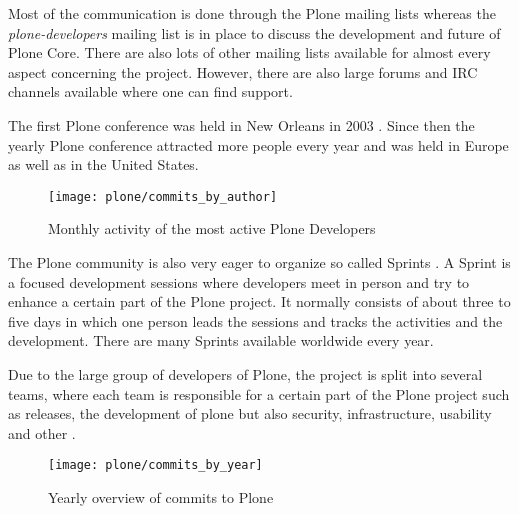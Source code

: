 Most of the communication is done through the Plone mailing lists whereas the
\emph{plone-developers} mailing list is in place to discuss the development and
future of Plone Core. There are also lots of other mailing lists available for
almost every aspect concerning the project. However, there are also large
forums and \ac{IRC} channels available where one can find support.

The first Plone conference was held in New Orleans in 2003
\cite{PloneConferences}. Since then the yearly Plone conference attracted more
people every year and was held in Europe as well as in the United States.

\begin{figure}[htbp]
  \centering
  \texttt{[image: plone/commits\_by\_author]}
  \caption{Monthly activity of the most active Plone Developers}
\end{figure}

The Plone community is also very eager to organize so called Sprints
\cite{PloneSprints}. A Sprint is a focused development sessions where
developers meet in person and try to enhance a certain part of the Plone
project. It normally consists of about three to five days in which one person
leads the sessions and tracks the activities and the development. There are
many Sprints available worldwide every year.

Due to the large group of developers of Plone, the project is split into
several teams, where each team is responsible for a certain part of the Plone
project such as releases, the development of plone but also security,
infrastructure, usability and other
\cite{PloneFounders,PloneReleaseManagers,PloneFrameworkTeam,PloneContribute}.

\begin{figure}[htbp]
  \centering
  \texttt{[image: plone/commits\_by\_year]}
  \caption{Yearly overview of commits to Plone}
\end{figure}


